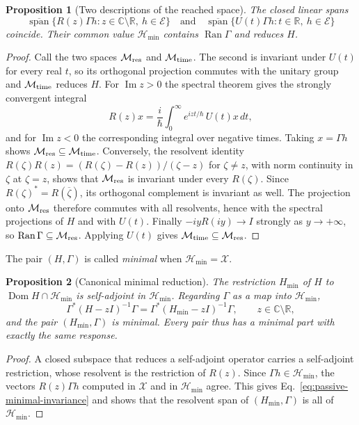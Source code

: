 \documentclass[11pt]{article}
\newtheorem{proposition}{Proposition}[section]
\theoremstyle{definition}
\DeclareMathOperator{\Ran}{Ran}
\DeclareMathOperator{\Span}{span}
\newcommand{\C}{\mathbb C}
\newcommand{\R}{\mathbb R}
\newcommand{\Hmin}{\mathcal H_{\min}}
\begin{document}
\begin{proposition}[Two descriptions of the reached space]
\label{prop:passive-two-spans}
The closed linear spans
\[
 \overline{\Span}\{R(z)\Gamma h:z\in\C\setminus\R,\ h\in\mathcal E\}
 \quad\text{and}\quad
 \overline{\Span}\{U(t)\Gamma h:t\in\R,\ h\in\mathcal E\}
\]
coincide. Their common value $\Hmin$ contains $\Ran\Gamma$ and reduces $H$.
\end{proposition}
\begin{proof}
Call the two spaces $\mathcal M_{\rm res}$ and $\mathcal M_{\rm time}$. The second is invariant under $U(t)$ for every real $t$, so its orthogonal projection commutes with the unitary group and $\mathcal M_{\rm time}$ reduces $H$. For $\operatorname{Im}z>0$ the spectral theorem gives the strongly convergent integral
\[
 R(z)x=\frac{i}{\hbar}\int_0^\infty e^{izt/\hbar}\,U(t)x\,dt ,
\]
and for $\operatorname{Im}z<0$ the corresponding integral over negative times. Taking $x=\Gamma h$ shows $\mathcal M_{\rm res}\subseteq\mathcal M_{\rm time}$. Conversely, the resolvent identity $R(\zeta)R(z)=(R(\zeta)-R(z))/(\zeta-z)$ for $\zeta\ne z$, with norm continuity in $\zeta$ at $\zeta=z$, shows that $\mathcal M_{\rm res}$ is invariant under every $R(\zeta)$. Since $R(\zeta)^*=R(\overline\zeta)$, its orthogonal complement is invariant as well. The projection onto $\mathcal M_{\rm res}$ therefore commutes with all resolvents, hence with the spectral projections of $H$ and with $U(t)$. Finally $-iyR(iy)\to I$ strongly as $y\to+\infty$, so $\Ran\Gamma\subseteq\mathcal M_{\rm res}$. Applying $U(t)$ gives $\mathcal M_{\rm time}\subseteq\mathcal M_{\rm res}$.
\end{proof}

The pair $(H,\Gamma)$ is called \emph{minimal} when $\Hmin=\mathcal X$.

\begin{proposition}[Canonical minimal reduction]
\label{prop:passive-minimal-reduction}
The restriction $H_{\min}$ of $H$ to $\operatorname{Dom}H\cap\Hmin$ is self-adjoint in $\Hmin$. Regarding $\Gamma$ as a map into $\Hmin$,
\begin{equation}
 \Gamma^*(H-zI)^{-1}\Gamma=\Gamma^*(H_{\min}-zI)^{-1}\Gamma ,\qquad z\in\C\setminus\R ,
 \label{eq:passive-minimal-invariance}
\end{equation}
and the pair $(H_{\min},\Gamma)$ is minimal. Every pair thus has a minimal part with exactly the same response.
\end{proposition}
\begin{proof}
A closed subspace that reduces a self-adjoint operator carries a self-adjoint restriction, whose resolvent is the restriction of $R(z)$. Since $\Gamma h\in\Hmin$, the vectors $R(z)\Gamma h$ computed in $\mathcal X$ and in $\Hmin$ agree. This gives Eq.~\eqref{eq:passive-minimal-invariance} and shows that the resolvent span of $(H_{\min},\Gamma)$ is all of $\Hmin$.
\end{proof}
\end{document}
